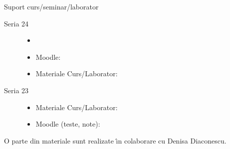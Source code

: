 \documentclass[xcolor=x11names,compress,10pt]{beamer}
\begin{document}
\begin{frame}{Suport curs/seminar/laborator }

\begin{description}
	\item[Seria 24] 
		\begin{itemize}
			\item {}

			\medskip
			\item Moodle:  
			\item Materiale Curs/Laborator: 
		\end{itemize}
	\item[Seria 23]
		\begin{itemize}
			\item Materiale Curs/Laborator: 
			\item Moodle (teste, note):  
		\end{itemize}
\end{description}

\bigskip 

O parte din  materiale sunt realizate \^{\i}n colaborare cu Denisa Diaconescu. 
\end{frame}



\end{document}
